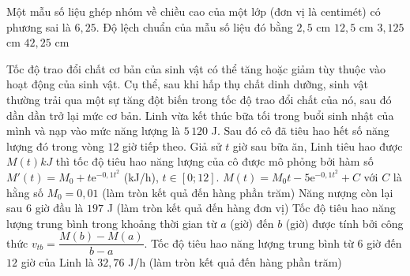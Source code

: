 %

\begin{ex}%
	Một mẫu số liệu ghép nhóm về chiều cao của một lớp (đơn vị là centimét) có phương sai là $6,25$. Độ lệch chuẩn của mẫu số liệu đó bằng
	\choice
	{\True$2{,}5$ cm}
	{$12{,}5$ cm}
	{$3{,}125$ cm}
	{$42{,}25$ cm}
\end{ex}

%

\begin{ex}%
	Tốc độ trao đổi chất cơ bản của sinh vật có thể tăng hoặc giảm tùy thuộc vào hoạt động của sinh vật. Cụ thể, sau khi hấp thụ chất dinh dưỡng, sinh vật thường trải qua một sự tăng đột biến trong tốc độ trao đổi chất của nó, sau đó dần dần trở lại mức cơ bản.
	Linh vừa kết thúc bữa tối trong buổi sinh nhật của mình và nạp vào mức năng lượng là $5\,120$ J. Sau đó cô đã tiêu hao hết số năng lượng đó trong vòng $12$ giờ tiếp theo. Giả sử $t$ giờ sau bữa ăn, Linh tiêu hao được $M(t) k J$ thì tốc độ tiêu hao năng lượng của cô được mô phỏng bởi hàm số $M'(t)=M_0+t \mathrm{e}^{-0{,}1t^2}$ (kJ/h), $t \in[0; 12]$.
	\choiceTF
	{\True $M(t)=M_0 t-5\mathrm{e}^{-0{,}1t^2}+C$ với $C$ là hằng số}
	{\True $M_0=0{,}01$ (làm tròn kết quả đến hàng phần trăm)}
	{Năng nượng còn lại sau $6$ giờ đầu là $197$ J (làm tròn kết quả đến hàng đơn vị)}
	{Tốc độ tiêu hao năng lượng trung bình trong khoảng thời gian từ $a$ (giờ) đến $b$ (giờ) được tính bởi công thức $v_{t b}=\dfrac{M(b)-M(a)}{b-a}$. Tốc độ tiêu hao năng lượng trung bình từ $6$ giờ đến $12$ giờ của Linh là $32{,}76$ J/h (làm tròn kết quả đến hàng phần trăm)}
\end{ex}

